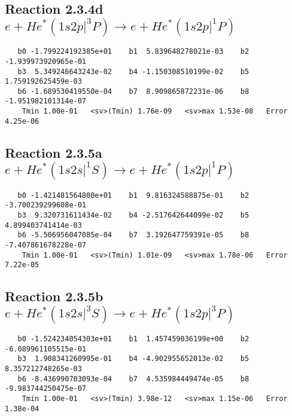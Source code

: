 \documentclass[12pt]{article}
\begin{document}
                              


\newpage
\subsection{
Reaction 2.3.4d $  e + He^*(1s2p|^3P) \rightarrow e + He^*(1s2p|^1P)$}


\begin{small}\begin{verbatim}
   b0 -1.799224192385e+01    b1  5.839648278021e-03    b2 -1.939973920965e-01
   b3  5.349246643243e-02    b4 -1.150308510199e-02    b5  1.759192625459e-03
   b6 -1.689530419550e-04    b7  8.909865872231e-06    b8 -1.951982101314e-07
    Tmin 1.00e-01   <sv>(Tmin) 1.76e-09   <sv>max 1.53e-08   Error 4.25e-06
\end{verbatim}\end{small}

\newpage
\subsection{
Reaction 2.3.5a $  e + He^*(1s2s|^1S) \rightarrow e + He^*(1s2p|^1P)$}


\begin{small}\begin{verbatim}
   b0 -1.421481564800e+01    b1  9.816324588875e-01    b2 -3.700239299608e-01
   b3  9.320731611434e-02    b4 -2.517642644099e-02    b5  4.899403741414e-03
   b6 -5.506956047085e-04    b7  3.192647759391e-05    b8 -7.407861678228e-07
    Tmin 1.00e-01   <sv>(Tmin) 1.01e-09   <sv>max 1.78e-06   Error 7.22e-05
\end{verbatim}\end{small}

\newpage
\subsection{
Reaction 2.3.5b $  e + He^*(1s2s|^3S) \rightarrow e + He^*(1s2p|^3P)$}


\begin{small}\begin{verbatim}
   b0 -1.524234054303e+01    b1  1.457459036199e+00    b2 -6.089961105515e-01
   b3  1.908341260995e-01    b4 -4.902955652013e-02    b5  8.357212748265e-03
   b6 -8.436990703093e-04    b7  4.535984449474e-05    b8 -9.983744250475e-07
    Tmin 1.00e-01   <sv>(Tmin) 3.98e-12   <sv>max 1.15e-06   Error 1.38e-04
\end{verbatim}\end{small}
\end{document}
